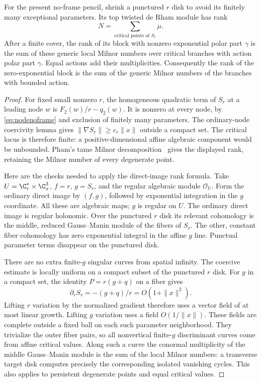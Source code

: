 \begin{lemma}
\label{lem:tamepencilrank}
For the present no-frame pencil, shrink a punctured $r$ disk to
avoid its finitely many exceptional parameters. Its top twisted
de Rham module has rank
\[
 N=\sum_{\text{critical points of }S_r}\mu.
\]
After a finite cover, the rank of its block with nonzero
exponential polar part $\gamma$ is the sum of these generic local
Milnor numbers over critical branches with action polar part
$\gamma$. Equal actions add their multiplicities. Consequently
the rank of the zero-exponential block is the sum of the generic
Milnor numbers of the branches with bounded action.
\end{lemma}
\begin{proof}
For fixed small nonzero $r$, the homogeneous quadratic term of
$S_r$ at a leading node $w$ is $F_2(w)/r-q_2(w)$. It is nonzero
at every node, by \eqref{eq:nodenoframe} and exclusion of finitely
many parameters. The ordinary-node coercivity lemma gives
$\|\nabla S_r\|\ge c_r\|x\|$ outside a compact set. The
critical locus is therefore finite: a positive-dimensional affine
algebraic component would be unbounded. Pham's tame Milnor
decomposition~\cite[Part~I, Sections~1--4]{Pham} gives the displayed
rank, retaining the Milnor number of every degenerate point.

Here are the checks needed to apply the direct-image rank formula.
Take $U=\C_r^*\times\C_x^3$, $f=r$, $g=S_r$, and the regular
algebraic module $\mathcal O_U$. Form the ordinary direct image
by $(f,g)$, followed by exponential integration in the $g$
coordinate. All these are algebraic maps; $g$ is regular on $U$.
The ordinary direct image is regular holonomic. Over the punctured
$r$ disk its relevant cohomology is the middle, reduced
Gauss--Manin module of the fibers of $S_r$. The other, constant
fiber cohomology has zero exponential integral in the affine $g$
line. Punctual parameter terms disappear on the punctured disk.

There are no extra finite-$g$ singular curves from spatial infinity.
The coercive estimate is locally uniform on a compact subset of
the punctured $r$ disk. For $g$ in a compact set, the identity
$P=r(g+q)$ on a fiber gives
\[
 \partial_r S_r=-(g+q)/r=O(1+\|x\|^2).
\]
Lifting $r$ variation by the normalized gradient therefore uses a
vector field of at most linear growth. Lifting $g$ variation uses
a field $O(1/\|x\|)$. These fields are complete outside a fixed
ball on each such parameter neighborhood. They trivialize the
outer fiber pairs, so all nonvertical finite-$g$ discriminant
curves come from affine critical values. Along such a curve the
conormal multiplicity of the middle Gauss--Manin module is the
sum of the local Milnor numbers: a transverse target disk computes
precisely the corresponding isolated vanishing cycles. This also
applies to persistent degenerate points and equal critical values.


\end{proof}
